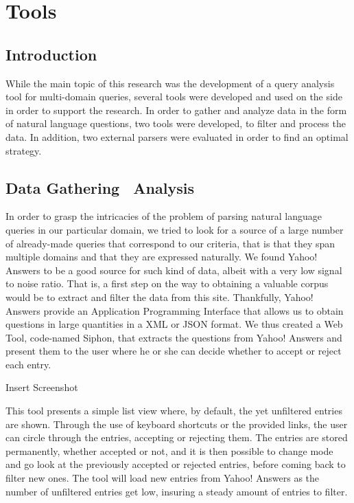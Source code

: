 \chapter{Tools} %
\label{cha:tools}

\section{Introduction} %
\label{sec:introduction_tools}
While the main topic of this research was the development of a query analysis tool for multi-domain queries, several tools were developed and used on the side in order to support the research. In order to gather and analyze data in the form of natural language questions, two tools were developed, to filter and process the data. In addition, two external parsers were evaluated in order to find an optimal strategy.

\section{Data Gathering \amper\ Analysis} %
\label{sec:data_gathering_and_analysis}

In order to grasp the intricacies of the problem of parsing natural language queries in our particular domain, we tried to look for a source of a large number of already-made queries that correspond to our criteria, that is that they span multiple domains and that they are expressed naturally. We found Yahoo! Answers to be a good source for such kind of data, albeit with a very low signal to noise ratio. That is, a first step on the way to obtaining a valuable corpus would be to extract and filter the data from this site. Thankfully, Yahoo! Answers provide an Application Programming Interface that allows us to obtain questions in large quantities in a XML or JSON format. We thus created a Web Tool, code-named Siphon, that extracts the questions from Yahoo! Answers and present them to the user where he or she can decide whether to accept or reject each entry.

\begin{huge}
  Insert Screenshot
\end{huge}

This tool presents a simple list view where, by default, the yet unfiltered entries are shown. Through the use of keyboard shortcuts or the provided links, the user can circle through the entries, accepting or rejecting them. The entries are stored permanently, whether accepted or not, and it is then possible to change mode and go look at the previously accepted or rejected entries, before coming back to filter new ones. The tool will load new entries from Yahoo! Answers as the number of unfiltered entries get low, insuring a steady amount of entries to filter.

